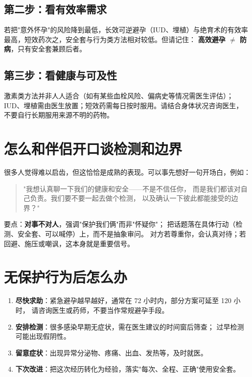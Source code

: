 \subsection*{第二步：看有效率需求}

若把"意外怀孕"的风险降到最低，长效可逆避孕（IUD、埋植）与绝育术的有效率
最高，短效药次之，安全套与行为类方法相对较低。但请记住：
\textbf{高效避孕 $\neq$ 防病}，只有安全套兼顾后者。

\subsection*{第三步：看健康与可及性}

激素类方法并非人人适合（如有某些血栓风险、偏病史等情况需医生评估）；
IUD、埋植需由医生放置；短效药需每日按时服用。请结合身体状况咨询医生，
不要自行长期服用来源不明的药物。

\section{怎么和伴侣开口谈检测和边界}

很多人觉得难以启齿，但这恰恰是成熟的表现。可以事先想好一句开场白，例如：

\begin{quote}
"我想认真聊一下我们的健康和安全——不是不信任你，
而是我们都该对自己负责。我们要不要一起去做个检测，
以及确认一下彼此都能接受的边界？"
\end{quote}

要点：\textbf{对事不对人}，强调"保护我们俩"而非"怀疑你"；
把话题落在具体行动（检测、安全套、可以喊停）上，而不是抽象审问。
对方若尊重你，会认真对待；若回避、施压或嘲讽，这本身就是重要信号。

\section{无保护行为后怎么办}

\begin{enumerate}[leftmargin=2em,itemsep=0.3em]
  \item \textbf{尽快求助}：紧急避孕越早越好，通常在 72 小时内，部分方案可延至 120 小时，
        请咨询医生或药师，不要当作常规避孕手段。
  \item \textbf{安排检测}：很多感染早期无症状，需在医生建议的时间窗后筛查；
        过早检测可能出现假阴性。
  \item \textbf{留意症状}：出现异常分泌物、疼痛、出血、发热等，及时就医。
  \item \textbf{下次改进}：把这次经历转化为经验，落实"每次、全程、正确"使用安全套。
\end{enumerate}


